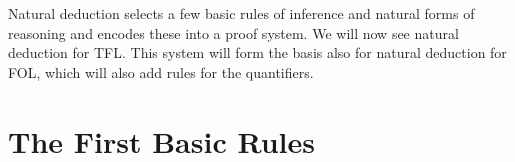 Natural deduction selects a few basic rules of inference and natural forms of reasoning and encodes these into a proof system. We will now see natural deduction for TFL. This system will form the basis also for natural deduction for FOL, which will also add rules for the quantifiers.

\chapter{The First Basic Rules}\label{sec:BasicTFL}


%
%
%
%
%
%
%
%
%
